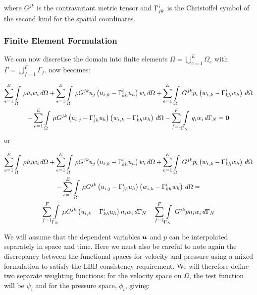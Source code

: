 where $G^{jk}$ is the contravariant metric tensor and
$ \Gamma^{i}_{jk} $ is the Christoffel symbol of the second kind for the spatial coordinates.

\subsubsection{Finite Element Formulation}

We can now discretise the domain into finite elements \ie $\Omega=\displaystyle{\bigcup_{e=1}^{E}}\Omega_{e}$ with $\Gamma=\displaystyle{\bigcup_{f=1}^{F}}\Gamma_{f}$.  now becomes:

\begin{multline}
 \label{FEMNSE}
  \dsum_{e=1}^{E}\gint{\Omega}{}{\rho\dot{u}_{i}w_{i}}{\Omega}
 +\dsum_{e=1}^{E}\gint{\Omega}{}{{\rho}G^{jk}{u_j}\pbrac{\partialderiv{u_{i}}{k}-\christoffel{i}{k}{h}u_h}{w_{i}}}{\Omega}
 +\dsum_{e=1}^{E}\gint{\Omega}{}{G^{jk}{p_{i}}\pbrac{\partialderiv{w_{i}}{k}-\christoffel{i}{k}{h}w_h}}{\Omega}\\
 -\dsum_{e=1}^{E}\gint{\Omega}{}{{\mu}G^{jk}\pbrac{\partialderiv{u_{i}}{j}-\christoffel{i}{j}{h}u_h}\pbrac{\partialderiv{w_{i}}{k}-\christoffel{i}{k}{h}w_h}}{\Omega}
 -\dsum_{f=1}^{F}\gint{\Gamma_N}{}{{q_{i}}{w_i}}{\Gamma_N}=\vect{0}
\end{multline} 
or


\begin{multline}
 \label{FEMNSE2}
  \displaystyle\sum_{e=1}^{E}  \displaystyle\int\limits_{\Omega}^{} \,\rho\dot{u}_{i}w_{i}\,d\Omega 
 +\displaystyle\sum_{e=1}^{E}  \displaystyle\int\limits_{\Omega}^{} \,{\rho}G^{jk}{u_j}\left(  {u_{i}}_{,k} - \Gamma^{i}_{kh} u_h \right){w_{i}}\,d\Omega 
 +\displaystyle\sum_{e=1}^{E}  \displaystyle\int\limits_{\Omega}^{} \,G^{jk}{p_{i}}\left(  {w_{i}}_{,k} - \Gamma^{i}_{kh} w_h \right)\,d\Omega \\
 -\displaystyle\sum_{e=1}^{E}  \displaystyle\int\limits_{\Omega}^{} \,{\mu}G^{jk}\left(  {u_{i}}_{,j} - \Gamma^{i}_{jh} u_h \right)\left(  {w_{i}}_{,k} - \Gamma^{i}_{kh} w_h \right)\,d\Omega =\\
 \displaystyle\sum_{f=1}^{F}  \displaystyle\int\limits_{\Gamma_N}^{} \,{\mu}G^{jk}\left(  {u_{i}}_{,k} - \Gamma^{i}_{kh} u_h \right){n_{i}}{w_{i}}\,d\Gamma_N 
-\displaystyle\sum_{f=1}^{F}  \displaystyle\int\limits_{\Gamma_N}^{} \,G^{jk}{p}{n_i}{w_i}\,d\Gamma_N 
\end{multline} 


We will assume that the dependent variables $\vect{u}$ and $p$ can be interpolated separately in space and time. Here we must also be careful to note again the discrepancy between the functional spaces for velocity and pressure using a mixed formulation to satisfy the LBB consistency requirement. We will therefore define two separate weighting functions: for the velocity space on $\Omega$, the test function will be $\psi_i$ and for the pressure space, $\phi_i$, giving:

